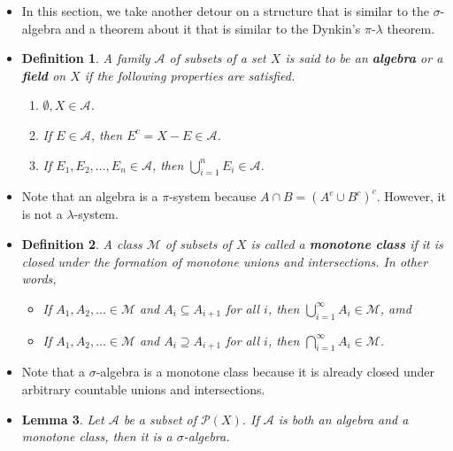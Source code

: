 \documentclass[10pt]{article}
\newtheorem{lemma}{Lemma}
\newtheorem{definition}[lemma]{Definition}
\newcommand{\mcal}[1]{\mathcal{#1}}
\begin{document}
\begin{itemize}
  \item In this section, we take another detour on a structure that is similar to the $\sigma$-algebra and a theorem about it that is similar to the Dynkin's $\pi$-$\lambda$ theorem.
  
  \item \begin{definition}
    A family $\mcal{A}$ of subsets of a set $X$ is said to be an {\bf algebra} or a {\bf field} on $X$ if the following properties are satisfied.
    \begin{enumerate}
      \item $\emptyset, X \in \mcal{A}$.
      \item If $E \in \mcal{A}$, then $E^c = X-E \in \mcal{A}$.
      \item If $E_1, E_2, \dotsc, E_n \in \mcal{A}$, then $\bigcup_{i=1}^n E_i \in \mcal{A}$.
    \end{enumerate}
  \end{definition}  

  \item Note that an algebra is a $\pi$-system because $A \cap B = (A^c \cup B^c)^c$. However, it is not a $\lambda$-system.

  \item \begin{definition}
    A class $\mcal{M}$ of subsets of $X$ is called a {\bf monotone class} if it is closed under the  formation of monotone unions and intersections. In other words,
    \begin{itemize}
      \item If $A_1, A_2, \dotsc \in \mcal{M}$ and $A_i \subseteq A_{i+1}$ for all $i$, then $\bigcup_{i=1}^\infty A_i \in \mcal{M}$, amd
      \item If $A_1, A_2, \dotsc \in \mcal{M}$ and $A_i \supseteq A_{i+1}$ for all $i$, then $\bigcap_{i=1}^\infty A_i \in \mcal{M}$.
    \end{itemize}
  \end{definition}

  \item Note that a $\sigma$-algebra is a monotone class because it is already closed under arbitrary countable unions and intersections.  
  
  \item \begin{lemma} \label{lemma:monotone-algebra-is-sigma-algebra}
    Let $\mcal{A}$ be a subset of $\mcal{P}(X)$. If $\mcal{A}$ is both an algebra and a monotone class, then it is a $\sigma$-algebra.
  \end{lemma}


\end{itemize}
\end{document}
